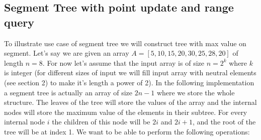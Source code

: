 \documentclass[11pt]{article}
\begin{document}
\subsection{Segment Tree with point update and range query}
To illustrate use case of segment tree we will construct tree with max value on segment.
Let's say we are given an array \(A = [5, 10, 15, 20, 30, 25, 28, 20]\) of length \(n = 8\).
For now let's assume that the input array is of size \(n = 2^{k}\) where \(k\) is integer (for different
sizes of input we will fill input array with neutral elements (see section 2) to make it's length a power of 2).
In the following implementation a segment tree is actually an array of size \(2n - 1\) where we store the whole structure.
The leaves of the tree will store the values of the array and the internal nodes will store the maximum value of the elements in their subtree.
For every internal node \(i\) the children of this node will be \(2i\) and \(2i + 1\), and the root of the tree will be at index 1.
We want to be able to perform the following operations:
\end{document}
